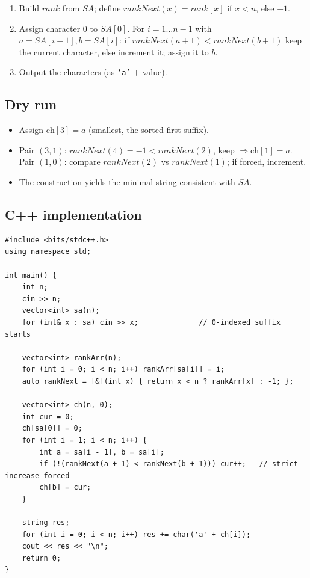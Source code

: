 \begin{enumerate}
  \item Build $\textit{rank}$ from $\textit{SA}$; define
        $\textit{rankNext}(x)=\textit{rank}[x]$ if $x<n$, else $-1$.
  \item Assign character $0$ to $\textit{SA}[0]$. For $i=1\ldots n-1$
        with $a=\textit{SA}[i-1],b=\textit{SA}[i]$: if
        $\textit{rankNext}(a+1)<\textit{rankNext}(b+1)$ keep the current
        character, else increment it; assign it to $b$.
  \item Output the characters (as \texttt{'a'} $+$ value).
\end{enumerate}

\subsection*{Dry run}


\begin{itemize}
  \item Assign $\text{ch}[3]=a$ (smallest, the sorted-first suffix).
  \item Pair $(3,1)$: $\textit{rankNext}(4)=-1<\textit{rankNext}(2)$, keep
        $\Rightarrow\text{ch}[1]=a$. Pair $(1,0)$: compare
        $\textit{rankNext}(2)$ vs $\textit{rankNext}(1)$; if forced,
        increment.
  \item The construction yields the minimal string consistent with
        $\textit{SA}$.
\end{itemize}

\subsection*{C++ implementation}

\begin{lstlisting}
#include <bits/stdc++.h>
using namespace std;

int main() {
    int n;
    cin >> n;
    vector<int> sa(n);
    for (int& x : sa) cin >> x;              // 0-indexed suffix starts

    vector<int> rankArr(n);
    for (int i = 0; i < n; i++) rankArr[sa[i]] = i;
    auto rankNext = [&](int x) { return x < n ? rankArr[x] : -1; };

    vector<int> ch(n, 0);
    int cur = 0;
    ch[sa[0]] = 0;
    for (int i = 1; i < n; i++) {
        int a = sa[i - 1], b = sa[i];
        if (!(rankNext(a + 1) < rankNext(b + 1))) cur++;   // strict increase forced
        ch[b] = cur;
    }

    string res;
    for (int i = 0; i < n; i++) res += char('a' + ch[i]);
    cout << res << "\n";
    return 0;
}
\end{lstlisting}

